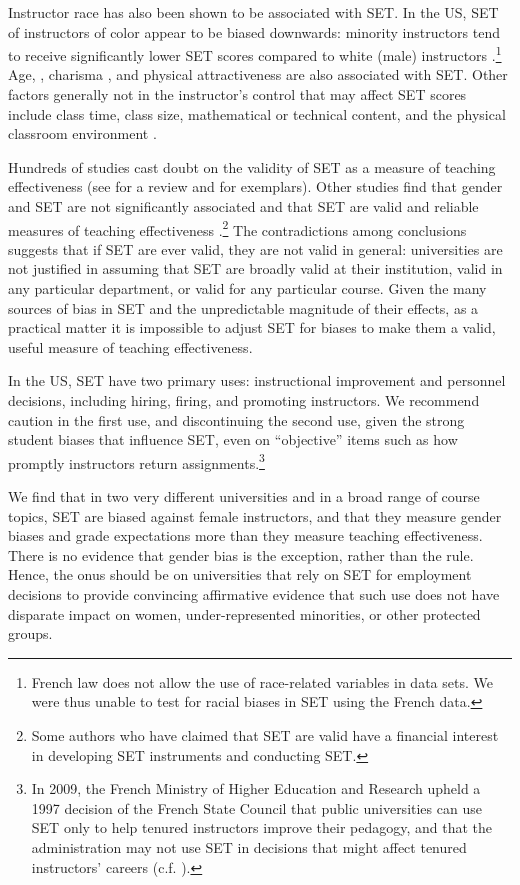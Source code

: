 \documentclass[12pt]{article}
\begin{document}
Instructor race has also been shown to be associated with SET.
In the US, SET of instructors of color appear to be biased downwards:
minority instructors tend to receive significantly lower SET scores compared to white (male) 
instructors \citep{Merritt2008}.\footnote{%
  French law does not allow the use of race-related variables in data sets. 
  We were thus unable to test for racial biases in SET using the French data.
} 
Age, \citep{Arbuckle2003}, 
charisma \citep{Shevlin2000}, and 
physical attractiveness \citep{Riniolo2006,Hamermesh2005} 
are also associated with SET.
Other factors generally not in the instructor's control that may affect SET scores include
class time, class size, mathematical or technical content, and the 
physical classroom environment \citep{Hill2010}.

Hundreds of studies cast doubt on the validity of SET as a measure of teaching effectiveness 
(see \citet{Pounder2007} for a review and \citet{Galbraith2012,Carrell2010a} for exemplars). 
Other studies find that gender and SET are not significantly associated \citep{Bennett1982,Centra2000,Elmore1974} and that SET are valid and reliable measures of teaching effectiveness \citep{Benton2012,Centra1977}.\footnote{%
  Some authors who have claimed that SET are valid have a financial interest in 
  developing SET instruments and conducting SET.
} 
The contradictions among conclusions suggests that if SET are ever valid, they
are not valid in general: universities are not justified in assuming that SET are broadly valid at their
institution, valid in any particular department, or valid for any particular course. 
Given the many sources of bias in 
SET and the unpredictable magnitude of their effects, as a practical matter it is impossible to adjust
SET for biases to make them a valid, useful measure of teaching effectiveness. 

In the US, SET have two primary uses: 
instructional improvement and personnel 
decisions, including hiring, firing, and promoting instructors. 
We recommend caution in the first use, and discontinuing the second use, 
given the strong student biases that 
influence SET, even on ``objective'' items such as how promptly instructors return
assignments.\footnote{%
  In 2009, the French Ministry of Higher Education and Research upheld a 1997 
  decision of the French State Council that public universities can use SET only to help 
  tenured instructors improve their pedagogy, and that the administration may not use 
  SET in decisions that might affect  tenured instructors' careers (c.f. \citet{Boring2015ofce}). 
}

We find that in two very different universities and in a broad range of course topics, 
SET are biased against female instructors, and that
they measure gender biases and grade expectations more than they measure teaching 
effectiveness.
There is no evidence that gender bias is the exception, rather than the rule.
Hence, the onus should be on universities 
that rely on SET for employment decisions to provide convincing affirmative evidence
that such use does not have disparate impact on women,
under-represented minorities, or other protected groups.



\end{document}
